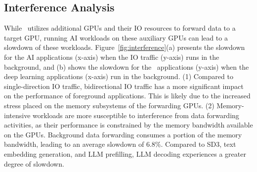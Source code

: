 

\begin{comment}
The \texttt{pred} array on GPU memory, and \texttt{SEL} is a hyperparameter that is inverse to the selectivity.
We implement this micro-benchmark using both GPU-IO and zero-copy data transfer and varies \texttt{SEL} from 1 to 128.
The result is presented in Figure~\ref{fig:selectivity-perf}.
We notice when \texttt{SEL} $>64$ zero-copy becomes more efficient. 
This corresponds to $TH < \frac{1}{64}$ and matches the result from our formula.
\end{comment}

\subsection{Interference Analysis}
\label{sec:interference}
\noindent
While \THISWORK\ utilizes additional GPUs and their IO resources to forward data to a target GPU, running AI workloads on these auxiliary GPUs can lead to a slowdown of these workloads.
Figure~\ref{fig:interference}(a) presents the slowdown for the AI applications (x-axis) when the IO traffic (y-axis) runs in the background, and (b) shows the slowdown for the \THISWORK\ applications (y-axis) when the deep learning applications (x-axis) run in the background.
(1) Compared to single-direction IO traffic, bidirectional IO traffic has a more significant impact on the performance of foreground applications. This is likely due to the increased stress placed on the memory subsystems of the forwarding GPUs.
(2) Memory-intensive workloads are more susceptible to interference from data forwarding activities, as their performance is constrained by the memory bandwidth available on the GPUs. 
Background data forwarding consumes a portion of the memory bandwidth, leading to an average slowdown of 6.8\%.
Compared to SD3, text embedding generation, and LLM prefilling, LLM decoding experiences a greater degree of slowdown.

